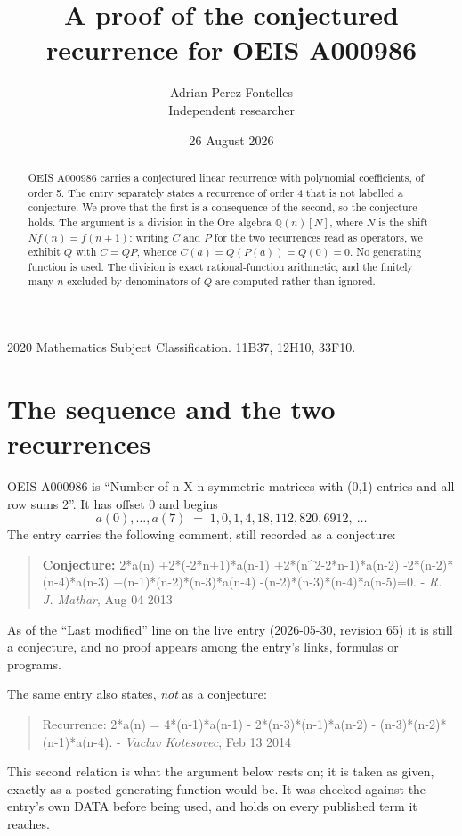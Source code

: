 \documentclass[11pt,a4paper]{article}
\title{A proof of the conjectured recurrence for OEIS A000986}
\author{Adrian Perez Fontelles\\ \small Independent researcher}
\date{26 August 2026}
\theoremstyle{plain}
\theoremstyle{definition}
\begin{document}
\maketitle

\begin{abstract}
OEIS A000986 carries a conjectured linear recurrence with polynomial coefficients, of
order 5. The entry separately states a recurrence of order 4 that is not
labelled a conjecture. We prove that the first is a consequence of the second, so the
conjecture holds. The argument is a division in the Ore algebra
$\mathbb{Q}(n)[N]$, where $N$ is the shift $Nf(n)=f(n+1)$: writing $C$ and $P$ for the two
recurrences read as operators, we exhibit $Q$ with $C=QP$, whence
$C(a)=Q(P(a))=Q(0)=0$. No generating function is used. The division is exact
rational-function arithmetic, and the finitely many $n$ excluded by denominators of $Q$
are computed rather than ignored.
\end{abstract}

\noindent\small 2020 Mathematics Subject Classification. 11B37, 12H10, 33F10.\normalsize

\section{The sequence and the two recurrences}

OEIS A000986 is ``Number of n X n symmetric matrices with (0,1) entries and all row sums 2''. It has offset $0$ and begins
\[
a(0),\dots,a(7)\;=\;1, 0, 1, 4, 18, 112, 820, 6912,\ \dots
\]
The entry carries the following comment, still recorded as a conjecture:
\begin{quote}\small
\textbf{Conjecture:} 2*a(n) +2*(-2*n+1)*a(n-1) +2*(n\^{}2-2*n-1)*a(n-2) -2*(n-2)*(n-4)*a(n-3) +(n-1)*(n-2)*(n-3)*a(n-4) -(n-2)*(n-3)*(n-4)*a(n-5)=0. - \emph{R. J. Mathar}, Aug 04 2013
\end{quote}
As of the ``Last modified'' line on the live entry (2026-05-30, revision 65) it is still
a conjecture, and no proof appears among the entry's links, formulas or programs.

The same entry also states, \emph{not} as a conjecture:
\begin{quote}\small
Recurrence: 2*a(n) = 4*(n-1)*a(n-1) - 2*(n-3)*(n-1)*a(n-2) - (n-3)*(n-2)*(n-1)*a(n-4). - \emph{Vaclav Kotesovec}, Feb 13 2014
\end{quote}
This second relation is what the argument below rests on; it is taken as given, exactly as
a posted generating function would be. It was checked against the entry's own DATA before
being used, and holds on every published term it reaches.
\end{document}
